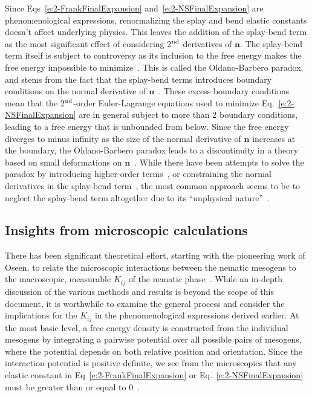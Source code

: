 Since Eqs~\ref{e:2-FrankFinalExpansion} and~\ref{e:2-NSFinalExpansion} are phenomenological expressions, renormalizing the splay and bend elastic constants doesn't affect underlying physics.
This leaves the addition of the splay-bend term as the most significant effect of considering 2$^\textup{\rm nd}$ derivatives of $\mathbf{n}$.
The splay-bend term itself is subject to controversy as its inclusion to the free energy makes the free energy impossible to minimize~\cite{RN214,RN215,RN216}.
This is called the Oldano-Barbero paradox, and stems from the fact that the splay-bend terms introduces boundary conditions on the normal derivative of $\mathbf{n}$~\cite{RN216,RN220,RN219,RN221}.
These excess boundary conditions mean that the 2$^\textup{\rm nd}$-order Euler-Lagrange equations used to minimize Eq.~\ref{e:2-NSFinalExpansion} are in general subject to more than 2 boundary conditions, leading to a free energy that is unbounded from below.
Since the free energy diverges to minus infinity as the size of the normal derivative of $\mathbf{n}$ increases at the boundary, the Oldano-Barbero paradox leads to a discontinuity in a theory based on small deformations on $\mathbf{n}$~\cite{RN219}.
While there have been attempts to solve the paradox by introducing higher-order terms~\cite{RN220}, or constraining the normal derivatives in the splay-bend term~\cite{RN221}, the most common approach seems to be to neglect the splay-bend term altogether due to its ``unphysical nature''~\cite{RN55,RN222}.

\subsection{Insights from microscopic calculations}
There has been significant theoretical effort, starting with the pioneering work of Oseen, to relate the microscopic interactions between the nematic mesogens to the macroscopic, measurable $K_{ij}$ of the nematic phase~\cite{RN56,RN55,RN205,RN217,RN225,RN224,RN218,RN222}.
While an in-depth discussion of the various methods and results is beyond the scope of this document, it is worthwhile to examine the general process and consider the implications for the $K_{ij}$ in the phenomenological expressions derived earlier.
At the most basic level, a free energy density is constructed from the individual mesogens by integrating a pairwise potential over all possible pairs of mesogens, where the potential depends on both relative position and orientation.
Since the interaction potential is positive definite, we see from the microscopics that any elastic constant in Eq~\ref{e:2-FrankFinalExpansion} or Eq.~\ref{e:2-NSFinalExpansion} must be greater than or equal to 0~\cite{RN205}.

